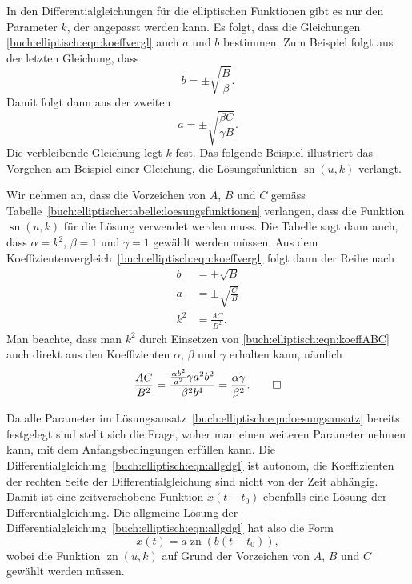 In den Differentialgleichungen für die elliptischen Funktionen gibt
es nur den Parameter $k$, der angepasst werden kann.
Es folgt, dass die Gleichungen
\eqref{buch:elliptisch:eqn:koeffvergl} 
auch $a$ und $b$ bestimmen.
Zum Beispiel folgt aus der letzten Gleichung, dass
\[
b = \pm\sqrt{\frac{B}{\beta}}.
\]
Damit folgt dann aus der zweiten
\[
a=\pm\sqrt{\frac{\beta C}{\gamma B}}.
\]
Die verbleibende Gleichung legt $k$ fest.
Das folgende Beispiel illustriert das Vorgehen am Beispiel einer
Gleichung, die Lösungsfunktion $\operatorname{sn}(u,k)$ verlangt.

\begin{beispiel}
Wir nehmen an, dass die Vorzeichen von $A$, $B$ und $C$ gemäss
Tabelle~\ref{buch:elliptische:tabelle:loesungsfunktionen} verlangen,
dass die Funktion $\operatorname{sn}(u,k)$ für die Lösung verwendet
werden muss.
Die Tabelle sagt dann auch, dass 
$\alpha=k^2$, $\beta=1$ und $\gamma=1$ gewählt werden müssen.
Aus dem Koeffizientenvergleich~\eqref{buch:elliptisch:eqn:koeffvergl}
folgt dann der Reihe nach
\begin{align*}
b&=\pm \sqrt{B}
\\
a&=\pm \sqrt{\frac{C}{B}}
\\
k^2
&=
\frac{AC}{B^2}.
\end{align*}
Man beachte, dass man $k^2$ durch Einsetzen von
\eqref{buch:elliptisch:eqn:koeffABC}
auch direkt aus den Koeffizienten $\alpha$, $\beta$ und $\gamma$
erhalten kann, nämlich
\[
\frac{AC}{B^2}
=
\frac{\frac{\alpha b^2}{a^2} \gamma a^2b^2}{\beta^2 b^4}
=
\frac{\alpha\gamma}{\beta^2}.
\qedhere
\]
\end{beispiel}

Da alle Parameter im 
Lösungsansatz~\eqref{buch:elliptisch:eqn:loesungsansatz} bereits
festgelegt sind stellt sich die Frage, woher man einen weiteren
Parameter nehmen kann, mit dem Anfangsbedingungen erfüllen kann.
Die Differentialgleichung~\eqref{buch:elliptisch:eqn:allgdgl} ist
autonom, die Koeffizienten der rechten Seite der Differentialgleichung
sind nicht von der Zeit abhängig. 
Damit ist eine zeitverschobene Funktion $x(t-t_0)$ ebenfalls eine
Lösung der Differentialgleichung.
Die allgmeine Lösung der 
Differentialgleichung~\eqref{buch:elliptisch:eqn:allgdgl} hat
also die Form
\[
x(t) = a\operatorname{zn}(b(t-t_0)),
\]
wobei die Funktion $\operatorname{zn}(u,k)$ auf Grund der Vorzeichen
von $A$, $B$ und $C$ gewählt werden müssen.

